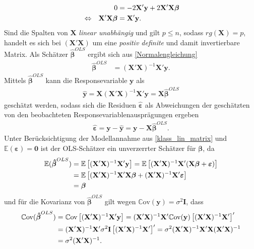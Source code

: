 \documentclass[12pt, a4paper]{report}\usepackage[]{graphicx}\usepackage[]{color}
\begin{document}
\begin{align}\label{Normalengleichung}
&& 0&=-2\mathbf{X}'\mathbf{y} + 2\mathbf{X}'\mathbf{X}\boldsymbol{\beta} \notag \\
&\Leftrightarrow & \mathbf{X}'\mathbf{X}\boldsymbol{\beta}&= \mathbf{X}'\mathbf{y}.
\end{align}
Sind die Spalten von $\mathbf{X}$ \textit{linear unabhängig} und gilt $p \le n$, sodass $rg(\mathbf{X})=p$, handelt es sich bei $(\mathbf{X}'\mathbf{X})$ um eine \textit{positiv definite} und damit invertierbare Matrix. Als Schätzer $\boldsymbol{\hat{\beta}}^{OLS}$ ergibt sich aus \eqref{Normalengleichung}
\begin{align}\label{OLS_Schätzer}
\boldsymbol{\hat{\beta}}^{OLS} &= (\mathbf{X}'\mathbf{X})^{-1}\mathbf{X}'\mathbf{y}.
\end{align}
Mittels $\boldsymbol{\hat{\beta}}^{OLS}$ kann die Responsevariable $\mathbf{y}$ als
\begin{align}\label{y_Schaetzung}
\mathbf{\hat{y}}=\mathbf{X}(\mathbf{X}'\mathbf{X})^{-1}\mathbf{X}'\mathbf{y}=\mathbf{X}\boldsymbol{\hat{\beta}}^{OLS}
\end{align}
geschätzt werden, sodass sich die Residuen $\boldsymbol{\hat{\varepsilon}}$ als Abweichungen der geschätzten von den beobachteten Responsevariablenausprägungen ergeben
\begin{align}
\boldsymbol{\hat{\varepsilon}}=\mathbf{y}-\mathbf{\hat{y}}=\mathbf{y}-\mathbf{X}\boldsymbol{\hat{\beta}}^{OLS}.
\end{align}
Unter Berücksichtigung der Modellannahme aus \eqref{klass_lin_matrix} und $\mathbb{E}(\boldsymbol{\varepsilon})=\mathbf{0}$ ist der OLS-Schätzer ein unverzerrter Schätzer für $\boldsymbol{\beta}$, da
\begin{align}\label{Erwartungswert_OLS}
\mathbb{E}(\boldsymbol{\hat{\beta}}^{OLS})&=\mathbb{E}\left[(\mathbf{X}'\mathbf{X})^{-1}\mathbf{X}'\mathbf{y}\right]=\mathbb{E}\left[(\mathbf{X}'\mathbf{X})^{-1}\mathbf{X}'(\mathbf{X}\boldsymbol{\beta}+\boldsymbol{\varepsilon})\right] \notag \\
&= \mathbb{E}\left[(\mathbf{X}'\mathbf{X})^{-1}\mathbf{X}'\mathbf{X}\boldsymbol{\beta} + (\mathbf{X}'\mathbf{X})^{-1}\mathbf{X}'\boldsymbol{\varepsilon} \right] \notag \\
&=\boldsymbol{\beta}
\end{align}
und für die Kovarianz von $\boldsymbol{\hat{\beta}}^{OLS}$ gilt wegen $\mathbb{C}\text{ov}(\mathbf{y})=\sigma^2 \mathbf{I}$, dass
\begin{align}\label{Cov_OLS}
\mathbb{C}\text{ov}(\boldsymbol{\hat{\beta}}^{OLS})&=\mathbb{C}\text{ov}\left[(\mathbf{X}'\mathbf{X})^{-1}\mathbf{X}'\mathbf{y}\right]=(\mathbf{X}'\mathbf{X})^{-1}\mathbf{X}' \mathbb{C}\text{ov}(\mathbf{y})\left[(\mathbf{X}'\mathbf{X})^{-1}\mathbf{X}'\right]' \notag \\
&=(\mathbf{X}'\mathbf{X})^{-1}\mathbf{X}' \sigma^2 \mathbf{I}\left[(\mathbf{X}'\mathbf{X})^{-1}\mathbf{X}'\right]'=\sigma^2 (\mathbf{X}'\mathbf{X})^{-1}\mathbf{X}'\mathbf{X}(\mathbf{X}'\mathbf{X})^{-1} \notag \\
&=\sigma^2(\mathbf{X}'\mathbf{X})^{-1}.
\end{align}
\end{document}
